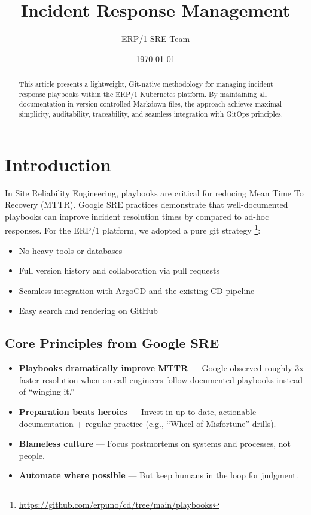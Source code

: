 \documentclass{article}
\title{Incident Response Management}
\author{ERP/1 SRE Team}
\date{\today}
\begin{document}
\maketitle

\begin{abstract}
This article presents a lightweight, Git-native methodology for managing incident response
playbooks within the ERP/1 Kubernetes platform. By maintaining all documentation
in version-controlled Markdown files, the approach achieves maximal simplicity, auditability,
traceability, and seamless integration with GitOps principles.
\end{abstract}

\tableofcontents

\newpage
\section{Introduction}

In Site Reliability Engineering, playbooks are critical for reducing Mean Time To Recovery (MTTR).
Google SRE practices demonstrate that well-documented playbooks can improve incident resolution times by
compared to ad-hoc responses. For the ERP/1 platform, we adopted a pure git strategy \footnote{\url{https://github.com/erpuno/cd/tree/main/playbooks}}:

\begin{itemize}
    \item No heavy tools or databases
    \item Full version history and collaboration via pull requests
    \item Seamless integration with ArgoCD and the existing CD pipeline
    \item Easy search and rendering on GitHub
\end{itemize}

\subsection{Core Principles from Google SRE}

\begin{itemize}
    \item \textbf{Playbooks dramatically improve MTTR} — Google observed roughly 3x faster resolution when on-call engineers follow documented playbooks instead of “winging it.”
    \item \textbf{Preparation beats heroics} — Invest in up-to-date, actionable documentation + regular practice (e.g., “Wheel of Misfortune” drills).
    \item \textbf{Blameless culture} — Focus postmortems on systems and processes, not people.
    \item \textbf{Automate where possible} — But keep humans in the loop for judgment.
\end{itemize}
\end{document}
